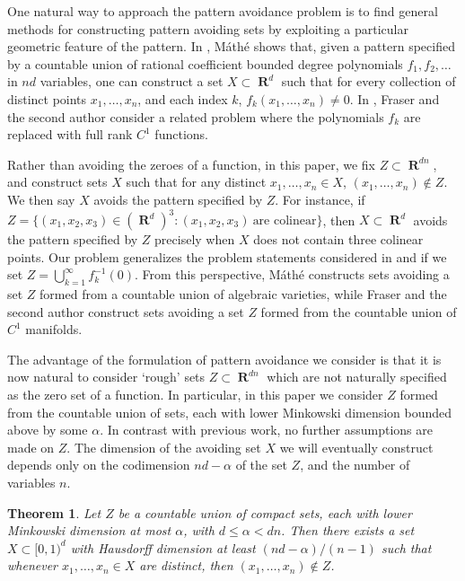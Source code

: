 \documentclass[dvipsnames,letterpaper,12pt]{article}
\numberwithin{equation}{section}
\theoremstyle{plain}
\newtheorem{theorem}{Theorem}
\DeclareMathOperator{\RR}{\mathbf{R}}
\begin{document}
One natural way to approach the pattern avoidance problem is to find general methods for constructing pattern avoiding sets by exploiting a particular geometric feature of the pattern. In \cite{Mathe}, M\'{a}th\'{e} shows that, given a pattern specified by a countable union of rational coefficient bounded degree polynomials $f_1, f_2, \dots$ in $nd$ variables, one can construct a set $X \subset \RR^d$ such that for every collection of distinct points $x_1, \dots, x_n$, and each index $k$, $f_k(x_1, \dots, x_n) \neq 0$. In \cite{MalabikaRob}, Fraser and the second author consider a related problem where the polynomials $f_k$ are replaced with full rank $C^1$ functions.



Rather than avoiding the zeroes of a function, in this paper, we fix $Z \subset \RR^{dn}$, and construct sets $X$ such that for any distinct $x_1, \dots, x_n \in X$, $(x_1, \dots, x_n) \not \in Z$. We then say $X$ avoids the pattern specified by $Z$. For instance, if $Z = \{ (x_1,x_2,x_3) \in (\RR^d)^3 : (x_1,x_2,x_3)\ \text{are colinear} \}$, then $X \subset \RR^d$ avoids the pattern specified by $Z$ precisely when $X$ does not contain three colinear points. Our problem generalizes the problem statements considered in \cite{Mathe} and \cite{MalabikaRob} if we set $Z = \bigcup_{k = 1}^\infty f_k^{-1}(0)$. From this perspective, M\'{a}th\'{e} constructs sets avoiding a set $Z$ formed from a countable union of algebraic varieties, while Fraser and the second author construct sets avoiding a set $Z$ formed from the countable union of $C^1$ manifolds.

The advantage of the formulation of pattern avoidance we consider is that it is now natural to consider `rough' sets $Z \subset \RR^{dn}$ which are not naturally specified as the zero set of a function. In particular, in this paper we consider $Z$ formed from the countable union of sets, each with lower Minkowski dimension bounded above by some $\alpha$. In contrast with previous work, no further assumptions are made on $Z$. The dimension of the avoiding set $X$ we will eventually construct depends only on the codimension $nd - \alpha$ of the set $Z$, and the number of variables $n$.

\begin{theorem}\label{mainTheorem}
	Let $Z$ be a countable union of compact sets, each with lower Minkowski dimension at most $\alpha$, with $d \leq \alpha < dn$. Then there exists a set $X \subset [0,1)^d$ with Hausdorff dimension at least $(nd - \alpha)/(n-1)$ such that whenever $x_1, \dots, x_n \in X$ are distinct, then $(x_1, \dots, x_n) \not \in Z$.
\end{theorem}
\end{document}
